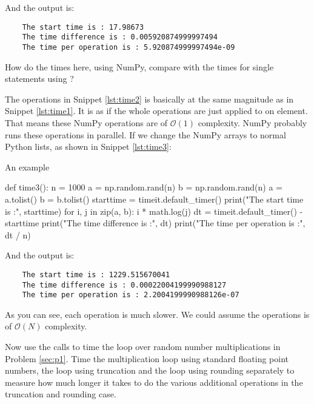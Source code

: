 And the output is:

\begin{verbatim}
    The start time is : 17.98673
    The time difference is : 0.005920874999997494
    The time per operation is : 5.920874999997494e-09
\end{verbatim}

\Question How do the times here, using NumPy, compare with the times for single
statements using ?

\Answer The operations in Snippet \ref{lst:time2} is basically at the same magnitude as
in Snippet \ref{lst:time1}. It is as if the whole operations are just applied to
on element. That means these NumPy operations are of $\mathcal{O}(1)$ complexity.
NumPy probably runs these operations in parallel.
If we change the NumPy arrays to normal Python lists, as shown in Snippet \ref{lst:time3}:

\begin{algorithm}[H]
    \caption{An example}
    \label{lst:time3}
    \begin{pythoncode}
        def time3():
            n = 1000
            a = np.random.rand(n)
            b = np.random.rand(n)
            a = a.tolist()
            b = b.tolist()
            starttime = timeit.default_timer()
            print("The start time is :", starttime)
            for i, j in zip(a, b):
                i * math.log(j)
            dt = timeit.default_timer() - starttime
            print("The time difference is :", dt)
            print("The time per operation is :", dt / n)
        \end{pythoncode}
\end{algorithm}

And the output is:

\begin{verbatim}
    The start time is : 1229.515670041
    The time difference is : 0.00022004199990988127
    The time per operation is : 2.2004199990988126e-07
\end{verbatim}

As you can see, each operation is much slower. We could assume the operations is
of $\mathcal{O}(N)$ complexity.

\Question Now use the  calls to time the loop over random number
multiplications in Problem \ref{sec:p1}. Time the multiplication loop using standard
floating point numbers, the loop using truncation and the loop using rounding separately to
measure how much longer it takes to do the various additional operations in the truncation
and rounding case.

